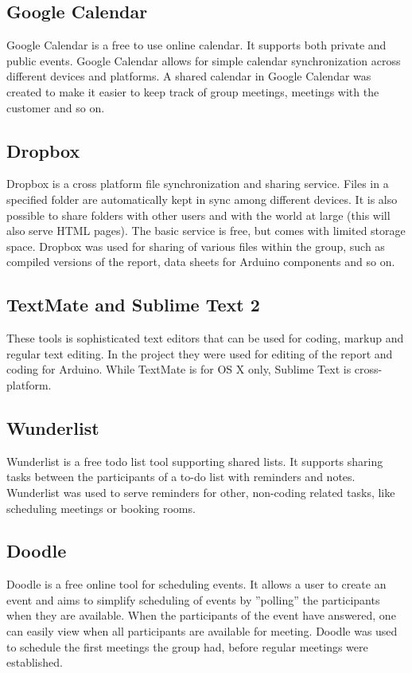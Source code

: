 \subsection{Google Calendar}
Google Calendar is a free to use online calendar. It supports both private and public events. Google Calendar allows for simple calendar synchronization across different devices and platforms. A shared calendar in Google Calendar was created to make it easier to keep track of group meetings, meetings with the customer and so on.

\subsection{Dropbox}
Dropbox is a cross platform file synchronization and sharing service. Files in a specified folder are automatically kept in sync among different devices. It is also possible to share folders with other users and with the world at large (this will also serve HTML pages). The basic service is free, but comes with limited storage space. Dropbox was used for sharing of various files within the group, such as compiled versions of the report, data sheets for Arduino components and so on.

\subsection{TextMate and Sublime Text 2}
These tools is sophisticated text editors that can be used for coding, markup and regular text editing. In the project they were used for editing of the report and coding for Arduino. While TextMate is for OS X only, Sublime Text is cross-platform.

\subsection{Wunderlist}
Wunderlist is a free todo list tool supporting shared lists. It supports sharing tasks between the participants of a to-do list with reminders and notes. Wunderlist was used to serve reminders for other, non-coding related tasks, like scheduling meetings or booking rooms.

\subsection{Doodle}
Doodle is a free online tool for scheduling events. It allows a user to create an event and aims to simplify scheduling of events by ''polling'' the participants when they are available. When the participants of the event have answered, one can easily view when all participants are available for meeting. Doodle was used to schedule the first meetings the group had, before regular meetings were established.

